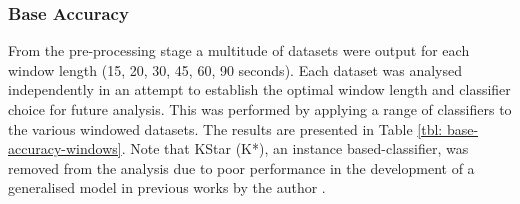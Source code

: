 \subsubsection{Base Accuracy}
From the pre-processing stage a multitude of datasets were output for each window length (15, 20, 30, 45, 60, 90 seconds). Each dataset was analysed independently in an attempt to establish the optimal window length and classifier choice for future analysis. This was performed by applying a range of classifiers to the various windowed datasets. The results are presented in Table \ref{tbl: base-accuracy-windows}. Note that KStar (K*), an instance based-classifier, was removed from the analysis due to poor performance in the development of a generalised model in previous works by the author \cite{Hartin2014-WAGER}.

\begin{table}[h]
\centering
\caption{Accuracy (\%) of classifiers tested for numerous window lengths, showing statistically significant improvement and degradation over base ZeroR classifier at the p \textless .05 level.}
\label{tbl: base-accuracy-windows}
\end{table}


